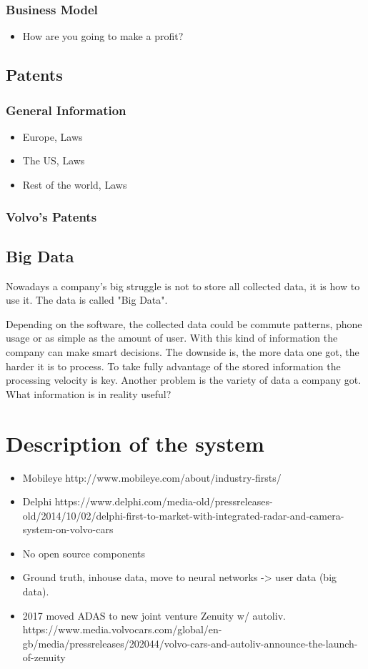 \documentclass[conference]{IEEEtran}
\begin{document}
\subsubsection{Business Model}
\begin{itemize}
	\item How are you going to make a profit?
\end{itemize}
\subsection{Patents}
\subsubsection{General Information}
\begin{itemize}
	\item Europe, Laws
	\item The US, Laws
	\item Rest of the world, Laws
\end{itemize}
\subsubsection{Volvo's Patents}
\subsection{Big Data}
Nowadays a company's big struggle is not to store all collected data, it is how to use it. The data is called "Big Data". 

Depending on the software, the collected data could be commute patterns, phone usage or as simple as the amount of user. With this kind of information the company can make smart decisions. The downside is, the more data one got, the harder it is to process. To take fully advantage of the stored information the processing velocity is key. Another problem is the variety of data a company got. What information is in reality useful? %

\section{Description of the system}
\begin{itemize}
	\item Mobileye http://www.mobileye.com/about/industry-firsts/
	\item Delphi https://www.delphi.com/media-old/pressreleases-old/2014/10/02/delphi-first-to-market-with-integrated-radar-and-camera-system-on-volvo-cars
	\item No open source components
	\item Ground truth, inhouse data, move to neural networks -> user data (big data).
	\item 2017 moved ADAS to new joint venture Zenuity w/ autoliv. https://www.media.volvocars.com/global/en-gb/media/pressreleases/202044/volvo-cars-and-autoliv-announce-the-launch-of-zenuity
\end{itemize}
\end{document}

